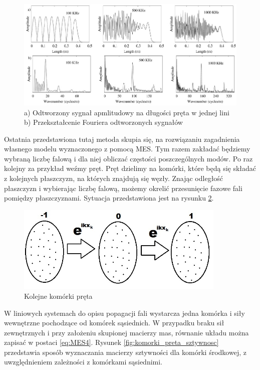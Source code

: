 \begin{figure}[h]
\centering
\includegraphics[width=12cm]{Zdjecia/2/widmo_wymuszenia_szerokopasmowe2}
\caption{a) Odtworzony sygnał apmlitudowy na długości pręta w jednej lini b) Przekształcenie Fouriera odtworzonych sygnałów \cite{bartek_valsamos}}
\label{fig:szer_odp_przestrzenne}
\end{figure}

\vspace{3mm}

Ostatnia przedstawiona tutaj metoda skupia się, na rozwiązaniu zagadnienia własnego modelu wyznaczonego z pomocą MES. Tym razem zakładać będziemy wybraną liczbę falową i dla niej obliczać częstości poszczególnych modów. 
Po raz kolejny za przykład weźmy pręt. Pręt dzielimy na komórki, które będą się składać z kolejnych płaszczyzn, na których znajdują się węzły. Znając odległość płaszczyzn i wybierając liczbę falową, możemy okrelić przesunięcie fazowe fali pomiędzy płaszczyznami. Sytuacja przedstawiona jest na rysunku \ref{fig:komorki_preta}.


\begin{figure}[h]
\centering
\includegraphics[width=10cm]{Zdjecia/2/metoda_numeryczna3}
\caption{Kolejne komórki pręta}
\label{fig:komorki_preta}
\end{figure}

W liniowych systemach do opisu popagacji fali wystarcza jedna komórka i siły wewnętrzne pochodzące od komórek sąsiednich. W przypadku braku sił zewnętrznych i przy założeniu skupionej macierzy mas, równanie układu można zapisać w postaci \ref{eq:MES4}. Rysunek \ref{fig:komorki_preta_sztywnosc} przedstawia sposób wyznaczania macierzy sztywności dla komórki środkowej, z uwzględnieniem zależności z komórkami sąsiednimi.

